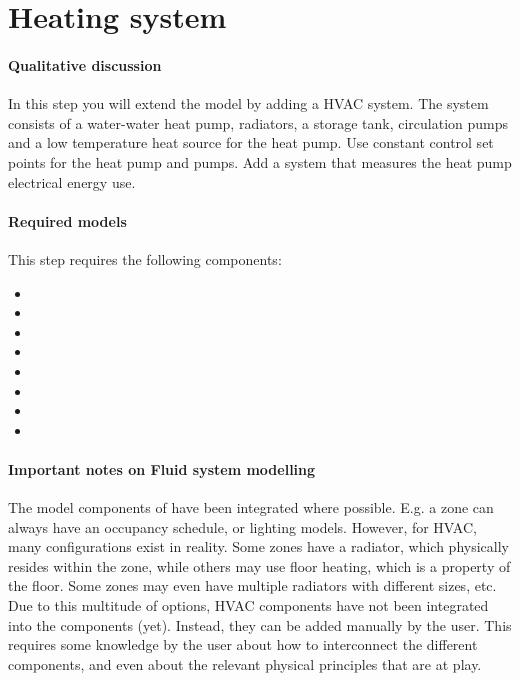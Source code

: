 \documentclass[10pt,a4paper]{article}
\begin{document}
\newpage

\section{Heating system}
\paragraph{Qualitative discussion}
In this step you will extend the model  
by adding a HVAC system.
The system consists of a water-water heat pump, radiators, 
a storage tank,
circulation pumps and a low temperature heat source for the heat pump.
Use constant control set points for the heat pump and pumps.
Add a system that measures the heat pump electrical energy use.

\paragraph{Required models}
This step requires the following components:
\begin{itemize}
\item {}
\item {}
\item {}
\item {}
\item {}
\item {}
\item {}
\item {}
\end{itemize}

\paragraph{Important notes on Fluid system modelling}
The model components of  have been integrated where possible.
E.g. a zone can always have an occupancy schedule, or lighting models. 
However, for HVAC, many configurations exist in reality. 
Some zones have a radiator, which physically resides within the zone, 
while others may use floor heating, which is a property of the floor.
Some zones may even have multiple radiators with different sizes, etc.
Due to this multitude of options, HVAC components have not been integrated into
the  components (yet).
Instead, they can be added manually by the user.
This requires some knowledge by the user about how to interconnect the different components, 
and even about the relevant physical principles that are at play. \\
\end{document}
